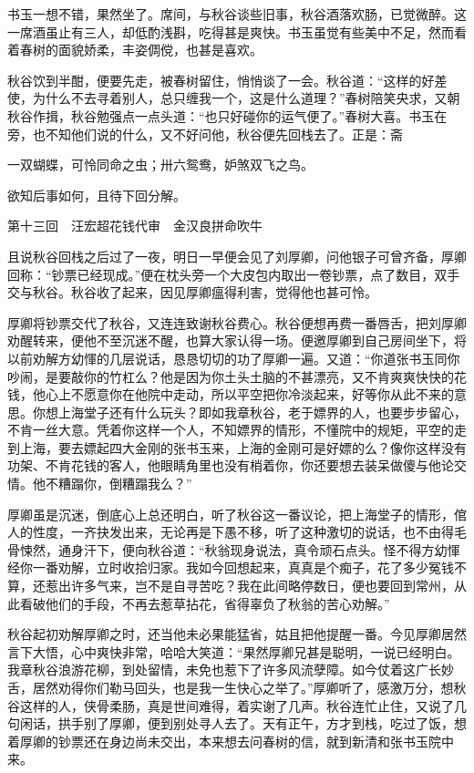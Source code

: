 \documentclass[12pt,UTF8]{ctexbook}
\begin{document}
{{{书玉一想不错，果然坐了。席间，与秋谷谈些旧事，秋谷酒落欢肠，已觉微醉。这一席酒虽止有三人，却低酌浅斟，吃得甚是爽快。书玉虽觉有些美中不足，然而看着春树的面貌娇柔，丰姿倜傥，也甚是喜欢。

秋谷饮到半酣，便要先走，被春树留住，悄悄谈了一会。秋谷道：“这样的好差使，为什么不去寻着别人，总只缠我一个，这是什么道理？”春树陪笑央求，又朝秋谷作揖，秋谷勉强点一点头道：“也只好碰你的运气便了。”春树大喜。书玉在旁，也不知他们说的什么，又不好问他，秋谷便先回栈去了。正是：斋

一双蝴蝶，可怜同命之虫；卅六鸳鸯，妒煞双飞之鸟。

欲知后事如何，且待下回分解。





第十三回　汪宏超花钱代审　金汉良拼命吹牛





且说秋谷回栈之后过了一夜，明日一早便会见了刘厚卿，问他银子可曾齐备，厚卿回称：“钞票已经现成。”便在枕头旁一个大皮包内取出一卷钞票，点了数目，双手交与秋谷。秋谷收了起来，因见厚卿瘟得利害，觉得他也甚可怜。

厚卿将钞票交代了秋谷，又连连致谢秋谷费心。秋谷便想再费一番唇舌，把刘厚卿劝醒转来，便他不至沉迷不醒，也算大家认得一场。便邀厚卿到自己房间坐下，将以前劝解方幼惲的几层说话，恳恳切切的功了厚卿一遍。又道：“你道张书玉同你吵闹，是要敲你的竹杠么？他是因为你土头土脑的不甚漂亮，又不肯爽爽快快的花钱，他心上不愿意你在他院中走动，所以平空把你冷淡起来，好等你从此不来的意思。你想上海堂子还有什么玩头？即如我章秋谷，老于嫖界的人，也要步步留心，不肯一丝大意。凭着你这样一个人，不知嫖界的情形，不懂院中的规矩，平空的走到上海，要去嫖起四大金刚的张书玉来，上海的金刚可是好嫖的么？像你这样没有功架、不肯花钱的客人，他眼睛角里也没有梢着你，你还要想去装呆做傻与他论交情。他不糟蹋你，倒糟蹋我么？”

厚卿虽是沉迷，倒底心上总还明白，听了秋谷这一番议论，把上海堂子的情形，倌人的性度，一齐抉发出来，无论再是下愚不移，听了这种激切的说话，也不由得毛骨悚然，通身汗下，便向秋谷道：“秋翁现身说法，真令顽石点头。怪不得方幼惲经你一番劝解，立时收拾归家。我如今回想起来，真真是个痴子，花了多少冤钱不算，还惹出许多气来，岂不是自寻苦吃？我在此间略停数日，便也要回到常州，从此看破他们的手段，不再去惹草拈花，省得辜负了秋翁的苦心劝解。”

秋谷起初劝解厚卿之时，还当他未必果能猛省，姑且把他提醒一番。今见厚卿居然言下大悟，心中爽快非常，哈哈大笑道：“果然厚卿兄甚是聪明，一说已经明白。我章秋谷浪游花柳，到处留情，未免也惹下了许多风流孽障。如今仗着这广长妙舌，居然劝得你们勒马回头，也是我一生快心之举了。”厚卿听了，感激万分，想秋谷这样的人，侠骨柔肠，真是世间难得，着实谢了几声。秋谷连忙止住，又说了几句闲话，拱手别了厚卿，便到别处寻人去了。天有正午，方才到栈，吃过了饭，想着厚卿的钞票还在身边尚未交出，本来想去问春树的信，就到新清和张书玉院中来。

}}}
\end{document}
